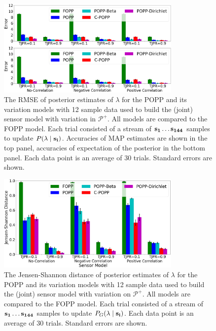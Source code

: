 \begin{figure}[t!]
	\centering
	\includegraphics[width=0.8\textwidth]{./figures/tjpr_comparison_120.png}
    \caption{The RMSE of posterior estimates of $\lambda$ for the POPP and its variation models with 12 sample data used to build the (joint) sensor model with variation in $\mathcal{P^+}$. All models are compared to the FOPP model. Each trial consisted of a stream of $\protect\mathbf{s_1} \ldots \protect\mathbf{s_{144}}$ samples to update $P(\lambda \mid \protect\mathbf{s_i})$. Accuracies of MAP estimates are shown in the top panel, accuracies of expectation of the posterior in the bottom panel. Each data point is an average of 30 trials. Standard errors are shown.} 
	\label{fig:tjpr_comparison_120}
	\vspace{-20pt}
\end{figure}

\begin{figure}[t!]
	\centering
	\includegraphics[width=0.8\textwidth]{./figures/tjpr_comparison_120_kl.png}
	\caption{The Jensen-Shannon distance of posterior estimates of $\lambda$ for the POPP and its variation models with 12 sample data used to build the (joint) sensor model with variation on $\mathcal{P^+}$. All models are compared to the FOPP model. Each trial consisted of a stream of $\protect\mathbf{s_1} \ldots \protect\mathbf{s_{144}}$ samples to update $P_G(\lambda \mid \protect\mathbf{s_i})$. Each data point is an average of 30 trials. Standard errors are shown.} 
	\label{fig:tjpr_comparison_120_kl}
	\vspace{-10pt}
\end{figure}

